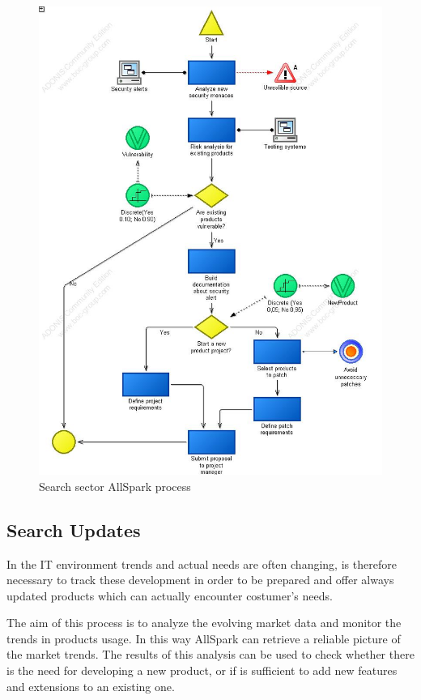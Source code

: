 \begin{figure}[!ht]
\begin{centering}
\includegraphics[scale=0.50]{assign2/adonis/imgs/sector.jpg}
\caption{Search sector AllSpark process}
\label{2img:sector}
\end{centering}
\end{figure}


\subsection{Search Updates}
In the IT environment trends and actual needs are often changing, is
therefore necessary to track these development in order to be prepared and
offer always updated products which can actually encounter costumer's
needs.

The aim of this process is to analyze the evolving market data and monitor
the trends in products usage. In this way AllSpark can retrieve a reliable
picture of the market trends.
The results of this analysis can be used to check whether there is the need
for developing a new product, or if is sufficient to add new features and
extensions to an existing one.

